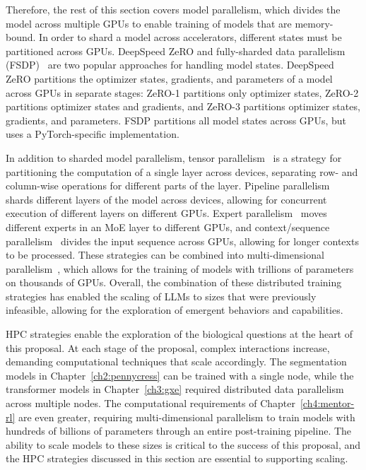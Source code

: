 Therefore, the rest of this section covers model parallelism, which divides the model across multiple GPUs to enable training of models that are memory-bound. In order to shard a model across accelerators, different states must be partitioned across GPUs. DeepSpeed ZeRO and fully-sharded data parallelism (FSDP)~\cite{rajbhandari2020zero, zhao2023fsdp} are two popular approaches for handling model states. DeepSpeed ZeRO partitions the optimizer states, gradients, and parameters of a model across GPUs in separate stages: ZeRO-1 partitions only optimizer states, ZeRO-2 partitions optimizer states and gradients, and ZeRO-3 partitions optimizer states, gradients, and parameters. FSDP partitions all model states across GPUs, but uses a PyTorch-specific implementation.

In addition to sharded model parallelism, tensor parallelism~\cite{shoeybi2019megatron} is a strategy for partitioning the computation of a single layer across devices, separating row- and column-wise operations for different parts of the layer. Pipeline parallelism~\cite{huang2019gpipe} shards different layers of the model across devices, allowing for concurrent execution of different layers on different GPUs. Expert parallelism~\cite{lepikhin2020gshard} moves different experts in an MoE layer to different GPUs, and context/sequence parallelism~\cite{jacobs2023ulysses} divides the input sequence across GPUs, allowing for longer contexts to be processed. These strategies can be combined into multi-dimensional parallelism~\cite{narayanan2021efficient}, which allows for the training of models with trillions of parameters on thousands of GPUs. Overall, the combination of these distributed training strategies has enabled the scaling of LLMs to sizes that were previously infeasible, allowing for the exploration of emergent behaviors and capabilities.

HPC strategies enable the exploration of the biological questions at the heart of this proposal. At each stage of the proposal, complex interactions increase, demanding computational techniques that scale accordingly. The segmentation models in Chapter~\ref{ch2:pennycress} can be trained with a single node, while the transformer models in Chapter~\ref{ch3:gxe} required distributed data parallelism across multiple nodes. The computational requirements of Chapter~\ref{ch4:mentor-rl} are even greater, requiring multi-dimensional parallelism to train models with hundreds of billions of parameters through an entire post-training pipeline. The ability to scale models to these sizes is critical to the success of this proposal, and the HPC strategies discussed in this section are essential to supporting scaling.

